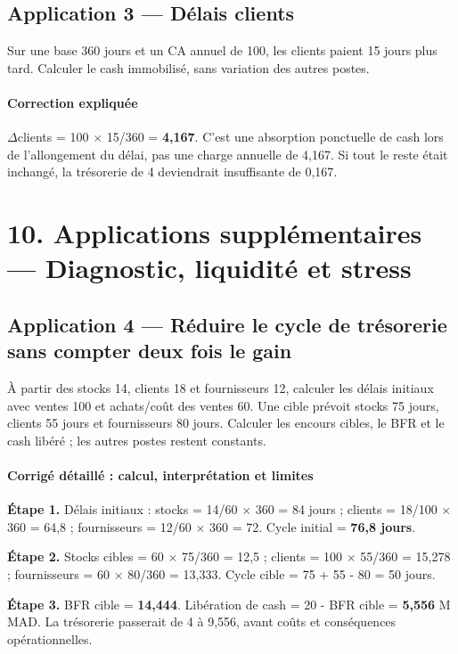 \documentclass[12pt,a4paper]{article}
\begin{document}
\subsection*{Application 3 --- Délais clients}
Sur une base 360 jours et un CA annuel de 100, les clients paient 15 jours plus tard. Calculer le cash immobilisé, sans variation des autres postes.


\paragraph{Correction expliquée}
$\Delta$clients = 100 $\times$ 15/360 = \textbf{4,167}. C’est une absorption ponctuelle de cash lors de l’allongement du délai, pas une charge annuelle de 4,167. Si tout le reste était inchangé, la trésorerie de 4 deviendrait insuffisante de 0,167.

\section*{10. Applications supplémentaires --- Diagnostic, liquidité et stress}

\subsection*{Application 4 --- Réduire le cycle de trésorerie sans compter deux fois le gain}
À partir des stocks 14, clients 18 et fournisseurs 12, calculer les délais initiaux avec ventes 100 et achats/coût des ventes 60. Une cible prévoit stocks 75 jours, clients 55 jours et fournisseurs 80 jours. Calculer les encours cibles, le BFR et le cash libéré ; les autres postes restent constants.


\paragraph{Corrigé détaillé : calcul, interprétation et limites}
\textbf{Étape 1.} Délais initiaux : stocks = 14/60 $\times$ 360 = 84 jours ; clients = 18/100 $\times$ 360 = 64,8 ; fournisseurs = 12/60 $\times$ 360 = 72. Cycle initial = \textbf{76,8 jours}.

\textbf{Étape 2.} Stocks cibles = 60 $\times$ 75/360 = 12,5 ; clients = 100 $\times$ 55/360 = 15,278 ; fournisseurs = 60 $\times$ 80/360 = 13,333. Cycle cible = 75 + 55 - 80 = 50 jours.

\textbf{Étape 3.} BFR cible = \textbf{14,444}. Libération de cash = 20 - BFR cible = \textbf{5,556} M MAD. La trésorerie passerait de 4 à 9,556, avant coûts et conséquences opérationnelles.
\end{document}
